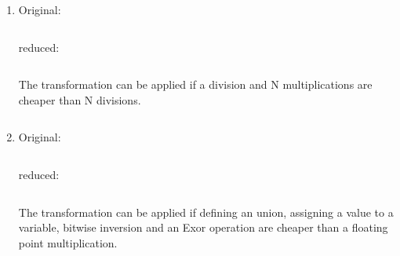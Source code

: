 \documentclass[parskip]{scrartcl}
\begin{document}
\begin{enumerate}[label=\alph*)]
		\inputminted[linenos,breaklines]{gas}{ex1/e.S}
		
		\item Original: \inputminted[linenos,breaklines]{c}{ex1/f.c}
		reduced: \inputminted[linenos,breaklines]{c}{ex1/f_reduced.c}
		
		The transformation can be applied if a division and N multiplications are cheaper than N divisions.
		
		\inputminted[linenos,breaklines]{gas}{ex1/f.S}
		
		\item Original: \inputminted[linenos,breaklines]{c}{ex1/g.c}
		reduced: \inputminted[linenos,breaklines]{c}{ex1/g_reduced.c}
		
		The transformation can be applied if defining an union, assigning a value to a variable, bitwise inversion and an Exor operation are cheaper than a floating point multiplication.
		
		\inputminted[linenos,breaklines]{gas}{ex1/g.S}
	\end{enumerate}
	
\end{document}
